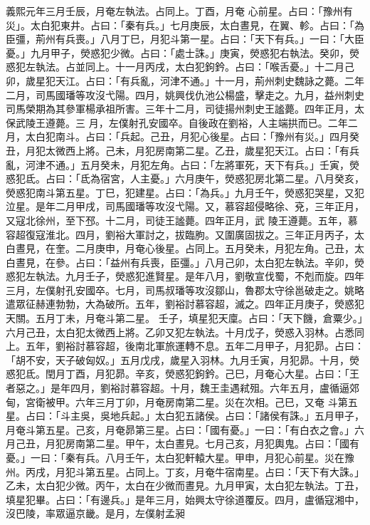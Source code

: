 \begin{pinyinscope}
 義熙元年三月壬辰，月奄左執法。占同上。丁酉，月奄
 心前星。占曰：「豫州有災」。太白犯東井。占曰：「秦有兵。」七月庚辰，太白晝見，在翼、軫。占曰：「為臣彊，荊州有兵喪。」八月丁巳，月犯斗第一星。占曰：「天下有兵。」一曰：「大臣憂。」九月甲子，熒惑犯少微。占曰：「處士誅。」庚寅，熒惑犯右執法。癸卯，熒惑犯左執法。占並同上。十一月丙戌，太白犯鉤鈐。占曰：「喉舌憂。」十二月己卯，歲星犯天江。占曰：「有兵亂，河津不通。」十一月，荊州刺史魏詠之薨。二年二月，司馬國璠等攻沒弋陽。四月，姚興伐仇池公楊盛，擊走之。九月，益州刺史司馬榮期為其參軍楊承祖所害。三年十二月，司徒揚州刺史王謐薨。四年正月，太保武陵王遵薨。三
 月，左僕射孔安國卒。自後政在劉裕，人主端拱而已。二年二月，太白犯南斗。占曰：「兵起。己丑，月犯心後星。占曰：「豫州有災。」四月癸丑，月犯太微西上將。己未，月犯房南第二星。乙丑，歲星犯天江。占曰：「有兵亂，河津不通。」五月癸未，月犯左角。占曰：「左將軍死，天下有兵。」壬寅，熒惑犯氐。占曰：「氐為宿宮，人主憂。」六月庚午，熒惑犯房北第二星。八月癸亥，熒惑犯南斗第五星。丁巳，犯建星。占曰：「為兵。」九月壬午，熒惑犯哭星，又犯泣星。是年二月甲戌，司馬國璠等攻沒弋陽。又，慕容超侵略徐、兗，三年正月，又寇北徐州，至下邳。十二月，司徒王謐薨。四年正月，武
 陵王遵薨。五年，慕容超復寇淮北。四月，劉裕大軍討之，拔臨朐。又圍廣固拔之。三年正月丙子，太白晝見，在奎。二月庚申，月奄心後星。占同上。五月癸未，月犯左角。己丑，太白晝見，在參。占曰：「益州有兵喪，臣彊。」八月己卯，太白犯左執法。辛卯，熒惑犯左執法。九月壬子，熒惑犯進賢星。是年八月，劉敬宣伐蜀，不剋而旋。四年三月，左僕射孔安國卒。七月，司馬叔璠等攻沒鄒山，魯郡太守徐邕破走之。姚略遣眾征赫連勃勃，大為破所。五年，劉裕討慕容超，滅之。四年正月庚子，熒惑犯天關。五月丁未，月奄斗第二星。
 壬子，填星犯天廩。占曰：「天下饑，倉粟少。」六月己丑，太白犯太微西上將。乙卯又犯左執法。十月戊子，熒惑入羽林。占悉同上。五年，劉裕討慕容超，後南北軍旅運轉不息。五年二月甲子，月犯昴。占曰：「胡不安，天子破匈奴。」五月戊戌，歲星入羽林。九月壬寅，月犯昴。十月，熒惑犯氐。閏月丁酉，月犯昴。辛亥，熒惑犯鉤鈐。己巳，月奄心大星。占曰：「王者惡之。」是年四月，劉裕討慕容超。十月，魏王圭遇弒殂。六年五月，盧循逼郊甸，宮衛被甲。六年三月丁卯，月奄房南第二星。災在次相。己巳，又奄
 斗第五星。占曰：「斗主吳，吳地兵起。」太白犯五諸侯。占曰：「諸侯有誅。」五月甲子，月奄斗第五星。己亥，月奄昴第三星。占曰：「國有憂。」一曰：「有白衣之會。」六月己丑，月犯房南第二星。甲午，太白晝見。七月己亥，月犯輿鬼。占曰：「國有憂。」一曰：「秦有兵。八月壬午，太白犯軒轅大星。甲申，月犯心前星。災在豫州。丙戌，月犯斗第五星。占同上。丁亥，月奄牛宿南星。占曰：「天下有大誅。」乙未，太白犯少微。丙午，太白在少微而晝見。九月甲寅，太白犯左執法。丁丑，填星犯畢。占曰：「有邊兵。」是年三月，始興太守徐道覆反。四月，盧循寇湘中，沒巴陵，率眾逼京畿。是月，左僕射孟昶

\end{pinyinscope}
